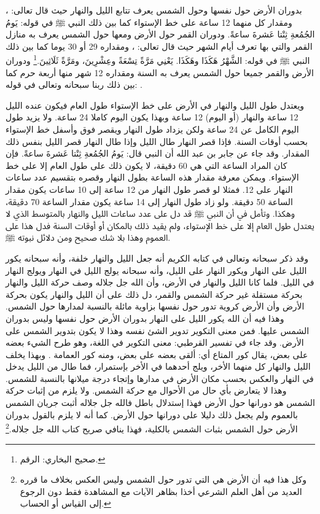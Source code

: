 بدوران الأرض حول نفسها وحول الشمس يعرف تتابع الليل والنهار حيث قال تعالى: \quranayah*[25][62]{\footnotesize \surahname*[25]}، ومقدار كل منهما 12 ساعة على خط الإستواء كما بين ذلك النبي ﷺ في قوله: يَومُ الجُمُعةِ ثِنْتا عَشرةَ ساعةً. ودوران القمر حول الأرض ومعها حول الشمس يعرف به منازل القمر والتي بها تعرف أيام الشهر حيث قال تعالى: \quranayah*[36][39]{\footnotesize \surahname*[36]}، ومقداره 29 أو 30 يوما كما بين ذلك النبي ﷺ في قوله: الشَّهْرُ هَكَذَا وهَكَذَا. يَعْنِي مَرَّةً تِسْعَةً وعِشْرِينَ، ومَرَّةً ثَلَاثِينَ.\footnote{ صحيح البخاري: الرقم.} ودوران الأرض والقمر جميعا حول الشمس يعرف به السنة ومقداره 12 شهر منها أربعة حرم كما بين ذلك ربنا سبحانه وتعالى في قوله: \quranayah*[9][36]{\footnotesize \surahname*[9]}. 

ويعتدل طول الليل والنهار في الأرض على خط الإستواء طول العام فيكون عنده الليل 12 ساعة والنهار (أو اليوم) 12 ساعة وبهذا يكون اليوم كاملا 24 ساعة. ولا يزيد طول اليوم الكامل عن 24 ساعة ولكن يزداد طول النهار ويقصر فوق وأسفل خط الإستواء بحسب أوقات السنة. فإذا قصر النهار طال الليل وإذا طال النهار قصر الليل بنفس ذلك المقدار. وقد جاء عن جابر بن عبد الله أن النبي قال: يَومُ الجُمُعةِ ثِنْتا عَشرةَ ساعةً. فإن كان المراد الساعة التي هي 60 دقيقة، لا يكون ذلك على طول العام إلا على خط الإستواء. ويمكن معرفة مقدار هذه الساعة بطول النهار وقصره بتقسيم عدد ساعات النهار على 12. فمثلا لو قصر طول النهار من 12 ساعة إلى 10 ساعات يكون مقدار الساعة 50 دقيقة. ولو زاد طول النهار إلى 14 ساعة يكون مقدار الساعة 70 دقيقة، وهكذا. وتأمل في أن النبي ﷺ  قد دل على عدد ساعات الليل والنهار بالمتوسط الذي لا يعتدل طول العام إلا على خط الإستواء، ولم يقيد ذلك بالمكان أو أوقات السنة فدل هذا على العموم وهذا بلا شك صحيح ومن دلائل نبوته ﷺ.

وقد ذكر سبحانه وتعالى في كتابه الكريم أنه جعل الليل والنهار خلفة، وأنه سبحانه يكور الليل على النهار ويكور النهار على الليل، وأنه سبحانه يولج الليل في النهار ويولج النهار في الليل. فلما كانا الليل والنهار في الأرض، وأن الله جل جلاله وصف حركة الليل والنهار بحركة مستقلة غير حركة الشمس والقمر، دل ذلك على أن الليل والنهار يكون بحركة الأرض وأن الأرض كروية تدور حول نفسها بزاوية مائلة بالنسبة لمدارها حول الشمس. وهذا فيه أن الله يكور الليل على النهار بدوران الأرض حول نفسها وليس بدوران الشمس عليها. فمن معنى التكوير تدوير الشئ نفسه وهذا لا يكون بتدوير الشمس على الأرض. وقد جاء في تفسير القرطبي: معنى التكوير في اللغة، وهو طرح الشيء بعضه على بعض، يقال كور المتاع أي: ألقى بعضه على بعض، ومنه كور العمامة 
\cite{tafsir_Qurtubi}. وبهذا يخلف الليل والنهار كل منهما الأخر، ويلج أحدهما في الأخر بإستمرار، فما طال من الليل يدخل في النهار والعكس بحسب مكان الأرض في مدارها وإتجاء درجة ميلانها بالنسبة للشمس. وهذا لا يتعارض بأي حال من الأحوال مع حركة الشمس. ولا يلزم من إثبات حركة الشمس هو دورانها حول الأرض فهذا إستدلال باطل فالله جل جلاله أثبت جريان الشمس بالعموم ولم يجعل ذلك دليلا على دورانها حول الأرض. كما أنه لا يلزم بالقول بدوران الأرض حول الشمس بثبات الشمس بالكلية، فهذا ينافي صريح كتاب الله جل جلاله.\footnote{وكل هذا فيه أن الأرض هي التي تدور حول الشمس وليس العكس بخلاف ما قرره العديد من أهل العلم الشرعي أخذا بظاهر الآيات مع المشاهدة فقط دون الرجوع إلى القياس أو الحساب.}

